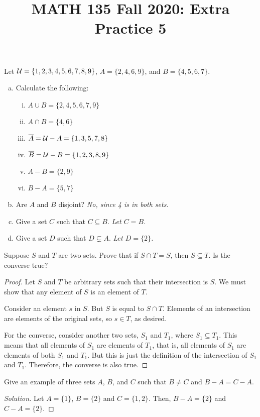 \documentclass{agony}
\title{MATH 135 Fall 2020: Extra Practice 5}
\begin{document}
\thispagestyle{firstpage}

\textbf{\thetitle}


\question Let $\mathcal{U}=\{1,2,3,4,5,6,7,8,9\}$, $A=\{2,4,6,9\}$, and $B=\{4,5,6,7\}$.
\begin{enumerate}[(a)]
  \item Calculate the following:
        \begin{enumerate}[i.]
          \item $A \cup B = \{2,4,5,6,7,9\}$
          \item $A \cap B = \{4,6\}$
          \item $\overline{A} = \mathcal{U} - A = \{1,3,5,7,8\}$
          \item $\overline{B} = \mathcal{U} - B = \{1,2,3,8,9\}$
          \item $A-B = \{2,9\}$
          \item $B-A = \{5,7\}$
        \end{enumerate}
  \item Are $A$ and $B$ disjoint? \emph{No, since 4 is in both sets.}
  \item Give a set $C$ such that $C \subseteq B$. \emph{Let $C=B$.}
  \item Give a set $D$ such that $D \subsetneq A$. \emph{Let $D=\{2\}$.}
\end{enumerate}

\question Suppose $S$ and $T$ are two sets.
Prove that if $S \cap T = S$, then $S \subseteq T$.
Is the converse true?
\begin{proof}
  Let $S$ and $T$ be arbitrary sets such that their intersection is $S$.
  We must show that any element of $S$ is an element of $T$.

  Consider an element $s$ in $S$.
  But $S$ is equal to $S \cap T$.
  Elements of an intersection are elements of the original sets, so $s \in T$, as desired.

  For the converse, consider another two sets, $S_1$ and $T_1$, where $S_1 \subseteq T_1$.
  This means that all elements of $S_1$ are elements of $T_1$, that is, all elements of $S_1$ are elements of both $S_1$ and $T_1$.
  But this is just the definition of the intersection of $S_1$ and $T_1$.
  Therefore, the converse is also true.
\end{proof}


\question Give an example of three sets $A$, $B$, and $C$ such that $B \neq C$ and $B-A = C-A$.
\begin{proof}[Solution]
  Let $A = \{1\}$, $B=\{2\}$ and $C=\{1,2\}$.
  Then, $B-A=\{2\}$ and $C-A=\{2\}$.
\end{proof}
\end{document}
